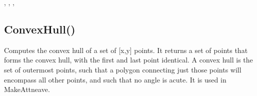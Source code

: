 \documentclass[letterpaper,10pt,english]{sphinxmanual}
\begin{document}
\sphinxAtStartPar
{}

\sphinxAtStartPar
{}, , ,

\ignorespaces 

\subsection{ConvexHull()}
\label{\detokenize{reference/graphics:convexhull}}\label{\detokenize{reference/graphics:index-1}}
\sphinxAtStartPar
{}

\sphinxAtStartPar
{}

\sphinxAtStartPar
Computes the convex hull of a set of {[}x,y{]}   points. It returns a set of points that forms the convex hull, with   the first and last point identical.  A convex hull is the set of   outermost points, such that a polygon connecting just those points   will encompass all other points, and such that no angle is acute.   It is used in MakeAttneave.

\sphinxAtStartPar
{}

\begin{sphinxVerbatim}[commandchars=\\\{\}]
\end{sphinxVerbatim}

\sphinxAtStartPar
{}
\end{document}
